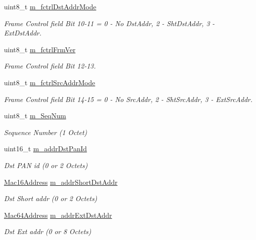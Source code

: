 \begin{DoxyCompactItemize}
uint8\+\_\+t \hyperlink{classns3_1_1LrWpanMacHeader_a02618462ab859dbb5cacffb93c73a209}{m\+\_\+fctrl\+Dst\+Addr\+Mode}
\begin{DoxyCompactList}\small\item\em Frame Control field Bit 10-\/11 = 0 -\/ No Dst\+Addr, 2 -\/ Sht\+Dst\+Addr, 3 -\/ Ext\+Dst\+Addr. \end{DoxyCompactList}\item 
uint8\+\_\+t \hyperlink{classns3_1_1LrWpanMacHeader_adfc97a10475b2a94f035bceac0f54170}{m\+\_\+fctrl\+Frm\+Ver}
\begin{DoxyCompactList}\small\item\em Frame Control field Bit 12-\/13. \end{DoxyCompactList}\item 
uint8\+\_\+t \hyperlink{classns3_1_1LrWpanMacHeader_a73a10a3c6b5bacfd52fcde03bb62bba5}{m\+\_\+fctrl\+Src\+Addr\+Mode}
\begin{DoxyCompactList}\small\item\em Frame Control field Bit 14-\/15 = 0 -\/ No Src\+Addr, 2 -\/ Sht\+Src\+Addr, 3 -\/ Ext\+Src\+Addr. \end{DoxyCompactList}\item 
uint8\+\_\+t \hyperlink{classns3_1_1LrWpanMacHeader_a122f0fd68833fcdeff7908327b6c5dcc}{m\+\_\+\+Seq\+Num}
\begin{DoxyCompactList}\small\item\em Sequence Number (1 Octet) \end{DoxyCompactList}\item 
uint16\+\_\+t \hyperlink{classns3_1_1LrWpanMacHeader_ad44a868435563fce4542a934ddb1c5f4}{m\+\_\+addr\+Dst\+Pan\+Id}
\begin{DoxyCompactList}\small\item\em Dst P\+AN id (0 or 2 Octets) \end{DoxyCompactList}\item 
\hyperlink{classns3_1_1Mac16Address}{Mac16\+Address} \hyperlink{classns3_1_1LrWpanMacHeader_ad658b952ffd2fd613da45c0852443ad9}{m\+\_\+addr\+Short\+Dst\+Addr}
\begin{DoxyCompactList}\small\item\em Dst Short addr (0 or 2 Octets) \end{DoxyCompactList}\item 
\hyperlink{classns3_1_1Mac64Address}{Mac64\+Address} \hyperlink{classns3_1_1LrWpanMacHeader_ad0a80303ece007cedbbd6c47db476304}{m\+\_\+addr\+Ext\+Dst\+Addr}
\begin{DoxyCompactList}\small\item\em Dst Ext addr (0 or 8 Octets) \end{DoxyCompactList}\item 

\end{DoxyCompactItemize}
